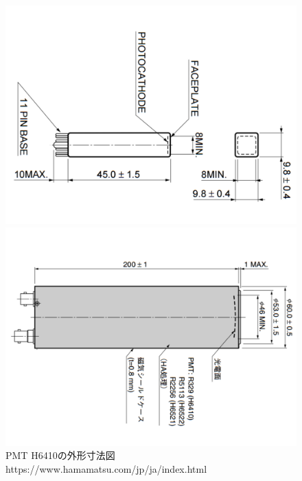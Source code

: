 \begin{figure}[htbp]
\begin{minipage}{0.5\hsize}
\centering
\includegraphics[keepaspectratio,angle=90,scale=0.4]{fig/ybm/pmtmini.pdf}
\caption{PMT R2248の外形寸法図\newline[ref]https://www.hamamatsu.com/jp/ja/index.html}
\label{fig:pmtmini}
\end{minipage}
\begin{minipage}{0.5\hsize}
\centering
\includegraphics[keepaspectratio,angle=90,scale=0.4]{fig/ybm/pmtbig.pdf}
\caption{PMT H6410の外形寸法図\newline[ref]https://www.hamamatsu.com/jp/ja/index.html}
\label{fig:pmtbig}
\end{minipage}
\end{figure}

